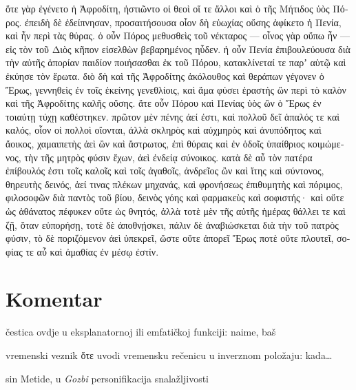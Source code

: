 {\large

\begin{greek}

\noindent ὅτε γὰρ ἐγένετο ἡ Ἀφροδίτη, ἡστιῶντο οἱ θεοὶ οἵ τε ἄλλοι καὶ ὁ τῆς Μήτιδος ὑὸς Πόρος. ἐπειδὴ δὲ ἐδείπνησαν, προσαιτήσουσα οἷον δὴ εὐωχίας οὔσης ἀφίκετο ἡ Πενία, καὶ ἦν περὶ τὰς θύρας. ὁ οὖν Πόρος μεθυσθεὶς τοῦ νέκταρος — οἶνος γὰρ οὔπω ἦν — εἰς τὸν τοῦ Διὸς κῆπον εἰσελθὼν βεβαρημένος ηὗδεν. ἡ οὖν Πενία ἐπιβουλεύουσα διὰ τὴν αὑτῆς ἀπορίαν παιδίον ποιήσασθαι ἐκ τοῦ Πόρου, κατακλίνεταί τε παρʼ αὐτῷ καὶ ἐκύησε τὸν ἔρωτα. διὸ δὴ καὶ τῆς Ἀφροδίτης ἀκόλουθος καὶ θεράπων γέγονεν ὁ Ἔρως, γεννηθεὶς ἐν τοῖς ἐκείνης γενεθλίοις, καὶ ἅμα φύσει ἐραστὴς ὢν περὶ τὸ καλὸν καὶ τῆς Ἀφροδίτης καλῆς οὔσης. ἅτε οὖν Πόρου καὶ Πενίας ὑὸς ὢν ὁ Ἔρως ἐν τοιαύτῃ τύχῃ καθέστηκεν. πρῶτον μὲν πένης ἀεί ἐστι, καὶ πολλοῦ δεῖ ἁπαλός τε καὶ καλός, οἷον οἱ πολλοὶ οἴονται, ἀλλὰ σκληρὸς καὶ αὐχμηρὸς καὶ ἀνυπόδητος καὶ ἄοικος, χαμαιπετὴς ἀεὶ ὢν καὶ ἄστρωτος, ἐπὶ θύραις καὶ ἐν ὁδοῖς ὑπαίθριος κοιμώμενος, τὴν τῆς μητρὸς φύσιν ἔχων, ἀεὶ ἐνδείᾳ σύνοικος. κατὰ δὲ αὖ τὸν πατέρα ἐπίβουλός ἐστι τοῖς καλοῖς καὶ τοῖς ἀγαθοῖς, ἀνδρεῖος ὢν καὶ ἴτης καὶ σύντονος, θηρευτὴς δεινός, ἀεί τινας πλέκων μηχανάς, καὶ φρονήσεως ἐπιθυμητὴς καὶ πόριμος, φιλοσοφῶν διὰ παντὸς τοῦ βίου, δεινὸς γόης καὶ φαρμακεὺς καὶ σοφιστής· καὶ οὔτε ὡς ἀθάνατος πέφυκεν οὔτε ὡς θνητός, ἀλλὰ τοτὲ μὲν τῆς αὐτῆς ἡμέρας θάλλει τε καὶ ζῇ, ὅταν εὐπορήσῃ, τοτὲ δὲ ἀποθνῄσκει, πάλιν δὲ ἀναβιώσκεται διὰ τὴν τοῦ πατρὸς φύσιν, τὸ δὲ ποριζόμενον ἀεὶ ὑπεκρεῖ, ὥστε οὔτε ἀπορεῖ Ἔρως ποτὲ οὔτε πλουτεῖ, σοφίας τε αὖ καὶ ἀμαθίας ἐν μέσῳ ἐστίν.

\end{greek}

}


\section*{Komentar}


\begin{description}[noitemsep]
\item[γὰρ] čestica ovdje u eksplanatornoj ili emfatičkoj funkciji: naime, baš
\item[ὅτε γὰρ ἐγένετο] vremenski veznik ὅτε uvodi vremensku rečenicu u inverznom položaju: kada…
\item[Πόρος] sin Metide, u \textit{Gozbi} personifikacija snalažljivosti

\end{description}

